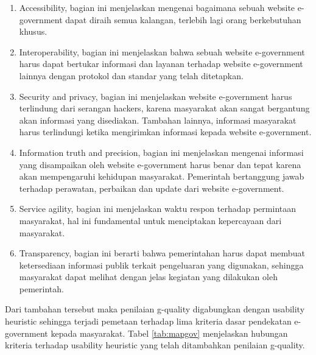 \begin{enumerate}
	\item Accessibility, bagian ini menjelaskan mengenai bagaimana sebuah website e-government dapat diraih semua kalangan, terlebih lagi orang berkebutuhan khusus.
	\item Interoperability, bagian ini menjelaskan bahwa sebuah website e-government harus dapat bertukar informasi dan layanan terhadap website e-government lainnya dengan protokol dan standar yang telah ditetapkan.
	\item Security and privacy, bagian ini menjelaskan website e-government harus terlindung dari serangan hackers, karena masyarakat akan sangat bergantung akan informasi yang disediakan. Tambahan lainnya, informasi masyarakat harus terlindungi ketika mengirimkan informasi kepada website e-government.
	\item Information truth and precision, bagian ini menjelaskan mengenai informasi yang disampaikan oleh website e-government harus benar dan tepat karena akan mempengaruhi kehidupan masyarakat. Pemerintah bertanggung jawab terhadap perawatan, perbaikan dan update dari website e-government.
	\item Service agility, bagian ini menjelaskan waktu respon terhadap permintaan masyarakat, hal ini fundamental untuk menciptakan kepercayaan dari masyarakat.
	\item Transparency, bagian ini berarti bahwa pemerintahan harus dapat membuat ketersediaan informasi publik terkait pengeluaran yang digunakan, sehingga masyarakat dapat melihat dengan jelas kegiatan yang dilakukan oleh pemerintah. 
\end{enumerate} 
Dari tambahan tersebut maka penilaian g-quality digabungkan dengan usability heuristic sehingga terjadi pemetaan terhadap lima kriteria dasar pendekatan e-government kepada masyarakat. Tabel \ref{tab:mapgov} menjelaskan hubungan kriteria terhadap usability heuristic yang telah ditambahkan penilaian g-quality.
